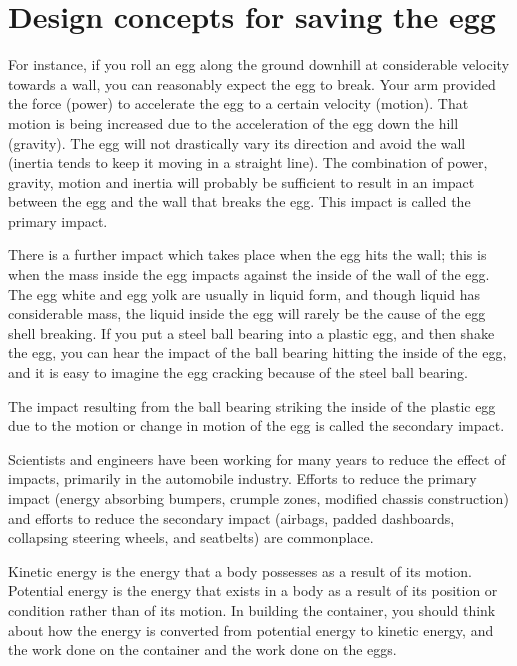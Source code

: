 \documentclass[hw]{exam}
\begin{document}
\section{Design concepts for saving the egg}
For instance, if you roll an egg along the ground downhill at considerable velocity towards a wall, you can reasonably expect the egg to break. Your arm provided the force (power) to accelerate the egg to a certain velocity (motion). That motion is being increased due to the acceleration of the egg down the hill (gravity). The egg will not drastically vary its direction and avoid the wall (inertia tends to keep it moving in a straight line). The combination of power, gravity, motion and inertia will probably be sufficient to result in an impact between the egg and the wall that breaks the egg. This impact is called the primary impact.

There is a further impact which takes place when the egg hits the wall; this is when the mass inside the egg impacts against the inside of the wall of the egg. The egg white and egg yolk are usually in liquid form, and though liquid has considerable mass, the liquid inside the egg will rarely be the cause of the egg shell breaking. If you put a steel ball bearing into a plastic egg, and then shake the egg, you can hear the impact of the ball bearing hitting the inside of the egg, and it is easy to imagine the egg cracking because of the steel ball bearing.

The impact resulting from the ball bearing striking the inside of the plastic egg due to the motion or change in motion of the egg is called the secondary impact.

Scientists and engineers have been working for many years to reduce the effect of impacts, primarily in the automobile industry. Efforts to reduce the primary impact (energy absorbing bumpers, crumple zones, modified chassis construction) and efforts to reduce the secondary impact (airbags, padded dashboards, collapsing steering wheels, and seatbelts) are commonplace.

Kinetic energy is the energy that a body possesses as a result of its motion. Potential energy is the energy that exists in a body as a result of its position or condition rather than of its motion.
In building the container, you should think about how the energy is converted from potential energy to kinetic energy, and the work done on the container and the work done on the eggs.
\end{document}
